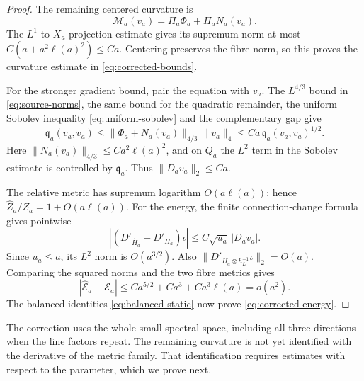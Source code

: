\begin{proof}
The remaining centered curvature is
\[
 \mathcal M_a(v_a)=\Pi_a\Phi_a+\Pi_aN_a(v_a).
\]
The \(L^1\)-to-\(X_a\) projection estimate gives its supremum
norm at most \(C(a+a^2\ell(a)^2)\le Ca\). Centering preserves
the fibre norm, so this proves the curvature estimate in
\eqref{eq:corrected-bounds}.

For the stronger gradient bound, pair the equation with
\(v_a\). The \(L^{4/3}\) bound in \eqref{eq:source-norms},
the same bound for the quadratic remainder, the uniform
Sobolev inequality \eqref{eq:uniform-sobolev} and the
complementary gap give
\[
 \mathfrak q_a(v_a,v_a)
 \le\|\Phi_a+N_a(v_a)\|_{4/3}\|v_a\|_4
 \le Ca\,\mathfrak q_a(v_a,v_a)^{1/2}.
\]
Here \(\|N_a(v_a)\|_{4/3}\le Ca^2\ell(a)^2\), and on
\(Q_a\) the \(L^2\) term in the Sobolev estimate is controlled
by \(\mathfrak q_a\). Thus \(\|D_av_a\|_2\le Ca\).

The relative metric has supremum logarithm \(O(a\ell(a))\);
hence \(\widehat Z_a/Z_a=1+O(a\ell(a))\). For the energy,
the finite connection-change formula gives pointwise
\[
 |(D'_{\widehat H_a}-D'_{H_a})\iota|
 \le C\sqrt{u_a}\,|D_av_a|.
\]
Since \(u_a\le a\), its \(L^2\) norm is \(O(a^{3/2})\).
Also \(\|D'_{H_a\otimes h_L^{-1}}\iota\|_2=O(a)\).
Comparing the squared norms and the two fibre metrics gives
\[
 |\widehat{\mathcal E}_a-\mathcal E_a|
 \le Ca^{5/2}+Ca^3+Ca^3\ell(a)=o(a^2).
\]
The balanced identities \eqref{eq:balanced-static} now prove
\eqref{eq:corrected-energy}.
\end{proof}

The correction uses the whole small spectral space, including all
three directions when the line factors repeat. The remaining
curvature is not yet identified with the derivative of the metric
family. That identification requires estimates with respect to
the parameter, which we prove next.
